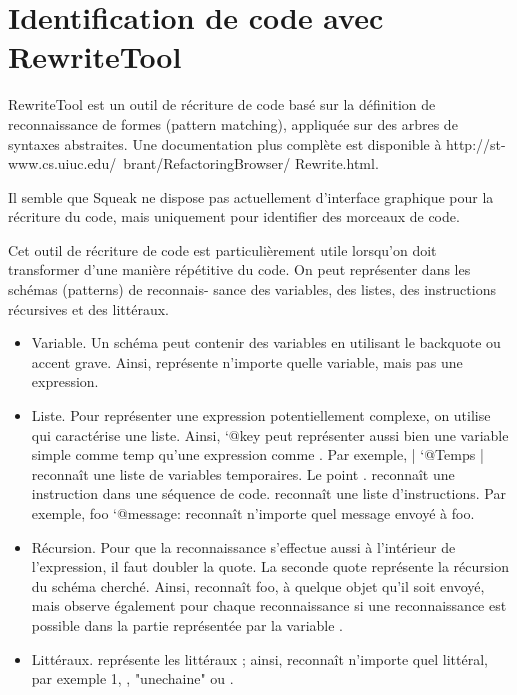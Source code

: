 \documentclass[a4paper,10pt,twoside]{book}
\begin{document}
\section{Identification de code avec RewriteTool}

RewriteTool est un outil de r\'ecriture de code bas\'e sur la d\'efinition
de reconnaissance de formes (pattern matching), appliqu\'ee sur des
arbres de syntaxes abstraites. Une documentation plus compl\`ete est
disponible à http://st-www.cs.uiuc.edu/~brant/RefactoringBrowser/
Rewrite.html.

Il semble que Squeak ne dispose pas actuellement d'interface graphique
pour la r\'ecriture du code, mais uniquement pour identifier des
morceaux de code.


Cet outil de r\'ecriture de code est particuli\`erement utile lorsqu'on
doit transformer d'une mani\`ere r\'ep\'etitive du code. On peut repr\'esenter
dans les sch\'emas (patterns) de reconnais- sance des variables, des
listes, des instructions r\'ecursives et des litt\'eraux.

\begin{itemize}
\item	Variable. Un sch\'ema peut contenir des variables en utilisant
  le backquote ou accent grave. Ainsi,  repr\'esente n'importe
  quelle variable, mais pas une expression.

\item Liste. Pour repr\'esenter une expression potentiellement
  complexe, on utilise  qui caract\'erise une liste. Ainsi, `@key
  peut repr\'esenter aussi bien une variable simple comme temp qu'une
  expression comme . Par exemple, | `@Temps
  | reconnaît une liste de variables temporaires. Le point . reconnaît
  une instruction dans une s\'equence de code.
  reconnaît une liste d'instructions. Par exemple, foo `@message:
   reconnaît n'importe quel message envoy\'e à foo.


\item R\'ecursion. Pour que la reconnaissance s'effectue aussi à
  l'int\'erieur de l'expression, il faut doubler la quote. La seconde
  quote repr\'esente la r\'ecursion du sch\'ema cherch\'e. Ainsi,
   reconnaît foo, à quelque objet qu'il soit envoy\'e,
  mais observe \'egalement pour chaque reconnaissance si une
  reconnaissance est possible dans la partie repr\'esent\'ee par la
  variable .

\item	Litt\'eraux. \ct{\\#} repr\'esente les litt\'eraux ; ainsi, 
  reconnaît n'importe quel litt\'eral, par exemple 1, \ct{\\#()}, "unechaine"
  ou .
\end{itemize}
\end{document}
